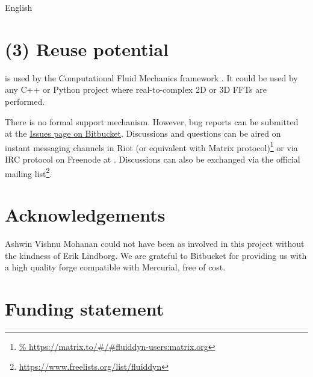 
English

\section{(3) Reuse potential}


 is used by the Computational Fluid Mechanics framework
 \citep{fluidsim}. It could be used by any C++ or Python project
where real-to-complex 2D or 3D FFTs are performed.

There is no formal support mechanism. However, bug reports can be submitted at
the \href{https://bitbucket.org/fluiddyn/fluidsim/issues}{Issues page on
Bitbucket}. Discussions and questions can be aired on instant messaging
channels in Riot (or equivalent with Matrix protocol)\footnote{
\url{%
  https://matrix.to/\#/\#fluiddyn-users:matrix.org}}
or via IRC protocol on Freenode at . Discussions
can also be exchanged via the official mailing list\footnote{
\url{https://www.freelists.org/list/fluiddyn}}.

\section{Acknowledgements}


Ashwin Vishnu Mohanan could not have been as involved in this project without the
kindness of Erik Lindborg.
%
We are grateful to Bitbucket for providing us with a high quality forge
compatible with Mercurial, free of cost.

\section{Funding statement}


